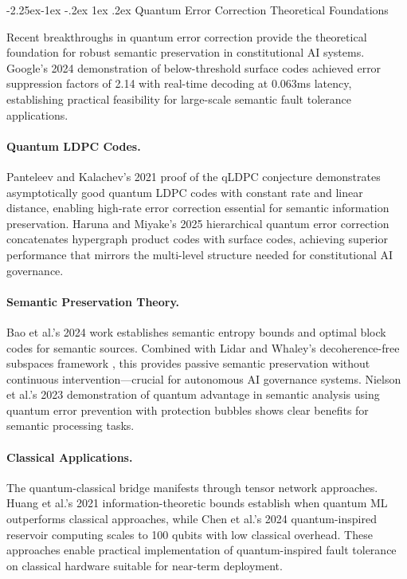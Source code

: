\documentclass[manuscript,screen,9pt]{acmart}
\makeatletter
\renewcommand\subsection{\@startsection{subsection}{2}{\z@}%
  {-2.25ex\@plus -1ex \@minus -.2ex}%
  {1ex \@plus .2ex}%
  {\normalfont\large\bfseries}}
\makeatother
\begin{document}
\subsection{Quantum Error Correction Theoretical Foundations}
\label{subsec:qec_foundations}

Recent breakthroughs in quantum error correction provide the theoretical foundation for robust semantic preservation in constitutional AI systems. Google's 2024 demonstration of below-threshold surface codes \cite{Acharya2024QuantumErrorCorrection} achieved error suppression factors of 2.14 with real-time decoding at 0.063ms latency, establishing practical feasibility for large-scale semantic fault tolerance applications.

\paragraph{Quantum LDPC Codes.} Panteleev and Kalachev's 2021 proof of the qLDPC conjecture \cite{Panteleev2021QuantumLDPC} demonstrates asymptotically good quantum LDPC codes with constant rate and linear distance, enabling high-rate error correction essential for semantic information preservation. Haruna and Miyake's 2025 hierarchical quantum error correction \cite{Haruna2025HierarchicalQEC} concatenates hypergraph product codes with surface codes, achieving superior performance that mirrors the multi-level structure needed for constitutional AI governance.

\paragraph{Semantic Preservation Theory.} Bao et al.'s 2024 work \cite{Bao2024SemanticEntropy} establishes semantic entropy bounds and optimal block codes for semantic sources. Combined with Lidar and Whaley's decoherence-free subspaces framework \cite{Lidar2024DecoherenceFree}, this provides passive semantic preservation without continuous intervention—crucial for autonomous AI governance systems. Nielson et al.'s 2023 demonstration \cite{Nielson2023QuantumAdvantage} of quantum advantage in semantic analysis using quantum error prevention with protection bubbles shows clear benefits for semantic processing tasks.

\paragraph{Classical Applications.} The quantum-classical bridge manifests through tensor network approaches. Huang et al.'s 2021 information-theoretic bounds \cite{Huang2021QuantumML} establish when quantum ML outperforms classical approaches, while Chen et al.'s 2024 quantum-inspired reservoir computing \cite{Chen2024QuantumReservoir} scales to 100 qubits with low classical overhead. These approaches enable practical implementation of quantum-inspired fault tolerance on classical hardware suitable for near-term deployment.
\end{document}
